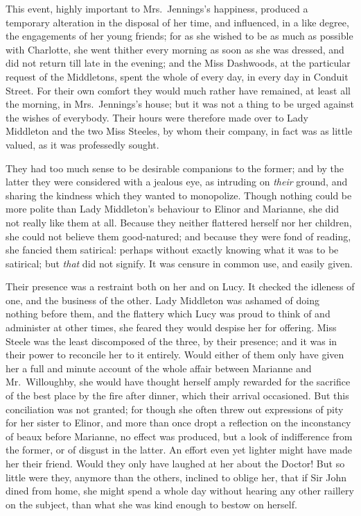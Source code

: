 \documentclass{article}
\begin{document}
This event, highly important to Mrs.\ Jennings's happiness,
produced a temporary alteration in the disposal of her time,
and influenced, in a like degree, the engagements
of her young friends; for as she wished to be as much
as possible with Charlotte, she went thither every morning
as soon as she was dressed, and did not return till late
in the evening; and the Miss Dashwoods, at the particular
request of the Middletons, spent the whole of every day,
in every day in Conduit Street.  For their own comfort
they would much rather have remained, at least all
the morning, in Mrs.\ Jennings's house; but it was not
a thing to be urged against the wishes of everybody.
Their hours were therefore made over to Lady Middleton
and the two Miss Steeles, by whom their company, in fact
was as little valued, as it was professedly sought.

They had too much sense to be desirable companions
to the former; and by the latter they were considered with
a jealous eye, as intruding on \emph{their} ground, and sharing
the kindness which they wanted to monopolize.  Though nothing
could be more polite than Lady Middleton's behaviour to
Elinor and Marianne, she did not really like them at all.
Because they neither flattered herself nor her children,
she could not believe them good-natured; and because they
were fond of reading, she fancied them satirical: perhaps
without exactly knowing what it was to be satirical;
but \emph{that} did not signify.  It was censure in common use,
and easily given.

Their presence was a restraint both on her and on Lucy.
It checked the idleness of one, and the business of the other.
Lady Middleton was ashamed of doing nothing before them,
and the flattery which Lucy was proud to think of
and administer at other times, she feared they would despise
her for offering.  Miss Steele was the least discomposed
of the three, by their presence; and it was in their power
to reconcile her to it entirely.  Would either of them
only have given her a full and minute account of the whole
affair between Marianne and Mr.\ Willoughby, she would
have thought herself amply rewarded for the sacrifice
of the best place by the fire after dinner, which their
arrival occasioned.  But this conciliation was not granted;
for though she often threw out expressions of pity for her
sister to Elinor, and more than once dropt a reflection
on the inconstancy of beaux before Marianne, no effect
was produced, but a look of indifference from the former,
or of disgust in the latter.  An effort even yet lighter
might have made her their friend.  Would they only have
laughed at her about the Doctor!  But so little were they,
anymore than the others, inclined to oblige her,
that if Sir John dined from home, she might spend a whole
day without hearing any other raillery on the subject,
than what she was kind enough to bestow on herself.
\end{document}

